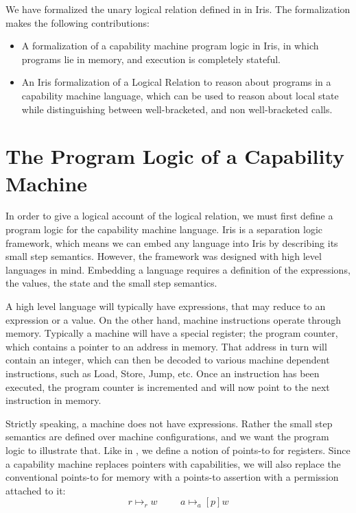 \documentclass[sigplan,review]{acmart}\settopmatter{printfolios=true,printccs=false,printacmref=false}
\begin{document}
We have formalized the unary logical relation defined in \cite{skorstengaardESOP18} in Iris. The formalization makes the following contributions: 
\begin{itemize}
	\item A formalization of a capability machine program logic in Iris, in which programs lie in memory, and execution is completely stateful. 
	\item An Iris formalization of a Logical Relation to reason about programs in a capability machine language, which can be used to reason about local state while distinguishing between well-bracketed, and non well-bracketed calls.
\end{itemize} 


\section{The Program Logic of a Capability Machine}
In order to give a logical account of the logical relation, we must first define a program logic for the capability machine language. Iris is a separation logic framework, which means we can embed any language into Iris by describing its small step semantics. However, the framework was designed with high level languages in mind. Embedding a language requires a definition of the expressions, the values, the state and the small step semantics. 

A high level language will typically have expressions, that may reduce to an expression or a value. On the other hand, machine instructions operate through memory. Typically a machine will have a special register; the program counter, which contains a pointer to an address in memory. That address in turn will contain an integer, which can then be decoded to various machine dependent instructions, such as Load, Store, Jump, etc. Once an instruction has been executed, the program counter is incremented and will now point to the next instruction in memory. 

Strictly speaking, a machine does not have expressions. Rather the small step semantics are defined over machine configurations, and we want the program logic to illustrate that. Like in \cite{Jensen:2013}, we define a notion of points-to for registers. Since a capability machine replaces pointers with capabilities, we will also replace the conventional points-to for memory with a points-to assertion with a permission attached to it: 
$$ r \mapsto_r w \hspace{1cm} a \mapsto_a[p] w $$
\end{document}

